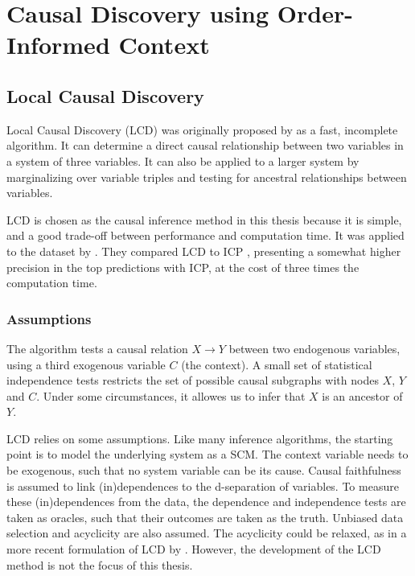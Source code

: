 \newpage
\section{Causal Discovery using Order-Informed Context}
\label{chapter:methodcontext}


\subsection{Local Causal Discovery}

Local Causal Discovery (LCD) was originally proposed by \citet{cooper1997simple} as a fast, incomplete algorithm. It can determine a direct causal relationship between two variables in a system of three variables. It can also be applied to a larger system by marginalizing over variable triples and testing for ancestral relationships between variables. 

LCD is chosen as the causal inference method in this thesis because it is simple, and a good trade-off between performance and computation time. It was applied to the \citet{kemmeren2014large} dataset by \citet{versteeg2019boosting}. They compared LCD to ICP \citep{peters2016causal}, presenting a somewhat higher precision in the top predictions with ICP, at the cost of three times the computation time. 

\subsubsection{Assumptions}

The algorithm tests a causal relation $X\to Y$ between two endogenous variables, using a third exogenous variable $C$ (the context). A small set of statistical independence tests restricts the set of possible causal subgraphs with nodes $X$, $Y$ and $C$. Under some circumstances, it allowes us to infer  that $X$ is an ancestor of $Y$.

LCD relies on some assumptions. Like many inference algorithms, the starting point is to model the underlying system as a SCM. The context variable needs to be exogenous, such that no system variable can be its cause. Causal faithfulness is assumed to link (in)dependences to the d-separation of variables. To measure these (in)dependences from the data, the dependence and independence tests are taken as oracles, such that their outcomes are taken as the truth. Unbiased data selection and acyclicity are also assumed. The acyclicity could be relaxed, as in a more recent formulation of LCD by \citet{mooij2016joint}. However, the development of the LCD method is not the focus of this thesis.

